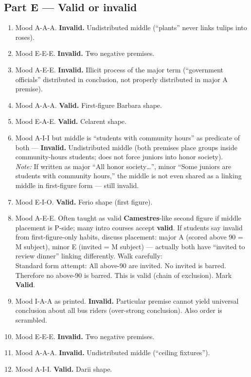 \documentclass[11pt]{article}
\begin{document}
\subsection*{Part E --- Valid or invalid}
\begin{enumerate}
\item Mood A-A-A. \textbf{Invalid.} Undistributed middle (``plants'' never links tulips into roses).
\item Mood E-E-E. \textbf{Invalid.} Two negative premises.
\item Mood A-E-E. \textbf{Invalid.} Illicit process of the major term (``government officials'' distributed in conclusion, not properly distributed in major A premise).
\item Mood A-A-A. \textbf{Valid.} First-figure Barbara shape.
\item Mood E-A-E. \textbf{Valid.} Celarent shape.
\item Mood A-I-I but middle is ``students with community hours'' as predicate of both --- \textbf{Invalid.} Undistributed middle (both premises place groups inside community-hours students; does not force juniors into honor society). \\
\textit{Note:} If written as major ``All honor society\ldots'', minor ``Some juniors are students with community hours,'' the middle is not even shared as a linking middle in first-figure form --- still invalid.
\item Mood E-I-O. \textbf{Valid.} Ferio shape (first figure).
\item Mood A-E-E. Often taught as valid \textbf{Camestres}-like second figure if middle placement is P-side; many intro courses accept \textbf{valid}. If students say invalid from first-figure-only habits, discuss placement: major A (scored above 90 = M subject), minor E (invited = M subject) --- actually both have ``invited to review dinner'' linking differently. Walk carefully:\\
\quad Standard form attempt: All above-90 are invited. No invited is barred. Therefore no above-90 is barred. This is valid (chain of exclusion). Mark \textbf{Valid}.
\item Mood I-A-A as printed. \textbf{Invalid.} Particular premise cannot yield universal conclusion about all bus riders (over-strong conclusion). Also order is scrambled.
\item Mood E-E-E. \textbf{Invalid.} Two negative premises.
\item Mood A-A-A. \textbf{Invalid.} Undistributed middle (``ceiling fixtures'').
\item Mood A-I-I. \textbf{Valid.} Darii shape.
\end{enumerate}
\end{document}
